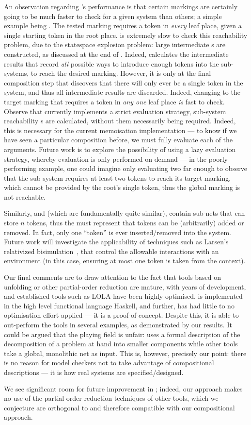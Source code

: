 An observation regarding \penrose{}'s performance is that certain markings are
certainly going to be much faster to check for a given system than others; a
simple example being \distree{-}{-}. The tested marking requires a token in
\emph{every} leaf place, given a single starting token in the root place.
\penrose{} is extremely slow to check this reachability problem, due to the
statespace explosion problem: large intermediate \TNFA{}s are constructed, as
discussed at the end of . Indeed, \penrose{}
calculates the intermediate results that record \emph{all} possible ways to
introduce enough tokens into the sub-systems, to reach the desired marking.
However, it is only at the final composition step that \penrose{} discovers
that there will only ever be a single token in the system, and thus all
intermediate results are discarded. Indeed, changing to the target marking that
requires a token in \emph{any one} leaf place \emph{is} fast to check. Observe
that \penrose{} currently implements a strict evaluation strategy, sub-system
reachability \TNFA{}s are calculated, without them necessarily being required.
Indeed, this is necessary for the current memoisation implementation --- to
know if we have seen a particular \TNFA{} composition before, we must fully
evaluate each of the arguments. Future work is to explore the possibility of
using a lazy evaluation strategy, whereby evaluation is only performed on
demand --- in the poorly performing example, one could imagine only evaluating
two far enough to observe that the sub-system requires at least two tokens to
reach its target marking, which cannot be provided by the root's single token,
thus the global marking is not reachable.

Similarly, \hartstoneSys{-} and \tokenringSys{-} (which are fundamentally quite
similar), contain sub-nets that can store $n$ tokens, thus the \TNFA{} must
represent that tokens can be (arbitrarily) added or removed. In fact, only one
``token'' is ever inserted/removed into the system. Future work will
investigate the applicability of techniques such as Larsen's relativized
bisimulation~\cite{Larsen1987}, that control the allowable interactions with an
environment (in this case, ensuring at most one token is taken from the
context).

Our final comments are to draw attention to the fact that tools based on
unfolding or other partial-order reduction are mature, with years of
development, and established tools such as LOLA have been highly optimised.
\penrose{} is implemented in the high level functional language Haskell, and
further, has had little to no optimisation effort applied --- it is a
proof-of-concept.  Despite this, it is able to out-perform the tools in several
examples, as demonstrated by our results. It could be argued that the playing
field is unfair: \penrose{} uses a formal description of the decomposition of a
problem at hand into smaller components while other tools take a global,
monolithic net as input. This is, however, precisely our point: there is no
reason for model checkers not to take advantage of compositional
descriptions --- it is how real systems are specified/designed.

We see significant room for future improvement in \penrose{}; indeed, our
approach makes no use of the partial-order reduction techniques of other tools,
which we conjecture are orthogonal to and therefore compatible with our
compositional approach.
